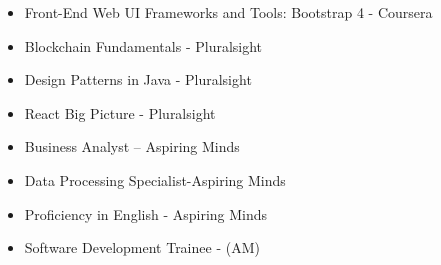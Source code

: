 \medskip
{}

\begin{itemize}
    \item Front-End Web UI Frameworks and Tools: Bootstrap 4  - Coursera
    \item Blockchain Fundamentals - Pluralsight
    \item Design Patterns in Java - Pluralsight
    \item React Big Picture - Pluralsight
    
    \item Business Analyst – Aspiring Minds
    \item Data Processing Specialist-Aspiring Minds
    \item Proficiency in English - Aspiring Minds
    \item Software Development Trainee - (AM)
\end{itemize}